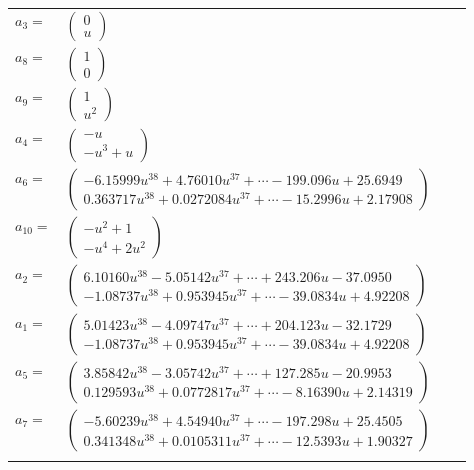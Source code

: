 \documentclass[1p]{elsarticle_modified}
\theoremstyle{definition}
\begin{document}
\begin{tabular}{m{7pt} m{180pt} m{7pt} m{180pt} }
\flushright $a_{3}=$&$\begin{pmatrix}0\\u\end{pmatrix}$ \\
\flushright $a_{8}=$&$\begin{pmatrix}1\\0\end{pmatrix}$ \\
\flushright $a_{9}=$&$\begin{pmatrix}1\\u^2\end{pmatrix}$ \\
\flushright $a_{4}=$&$\begin{pmatrix}- u\\- u^3+u\end{pmatrix}$ \\
\flushright $a_{6}=$&$\begin{pmatrix}-6.15999 u^{38}+4.76010 u^{37}+\cdots-199.096 u+25.6949\\0.363717 u^{38}+0.0272084 u^{37}+\cdots-15.2996 u+2.17908\end{pmatrix}$ \\
\flushright $a_{10}=$&$\begin{pmatrix}- u^2+1\\- u^4+2 u^2\end{pmatrix}$ \\
\flushright $a_{2}=$&$\begin{pmatrix}6.10160 u^{38}-5.05142 u^{37}+\cdots+243.206 u-37.0950\\-1.08737 u^{38}+0.953945 u^{37}+\cdots-39.0834 u+4.92208\end{pmatrix}$ \\
\flushright $a_{1}=$&$\begin{pmatrix}5.01423 u^{38}-4.09747 u^{37}+\cdots+204.123 u-32.1729\\-1.08737 u^{38}+0.953945 u^{37}+\cdots-39.0834 u+4.92208\end{pmatrix}$ \\
\flushright $a_{5}=$&$\begin{pmatrix}3.85842 u^{38}-3.05742 u^{37}+\cdots+127.285 u-20.9953\\0.129593 u^{38}+0.0772817 u^{37}+\cdots-8.16390 u+2.14319\end{pmatrix}$ \\
\flushright $a_{7}=$&$\begin{pmatrix}-5.60239 u^{38}+4.54940 u^{37}+\cdots-197.298 u+25.4505\\0.341348 u^{38}+0.0105311 u^{37}+\cdots-12.5393 u+1.90327\end{pmatrix}$\\&\end{tabular}
\end{document}
